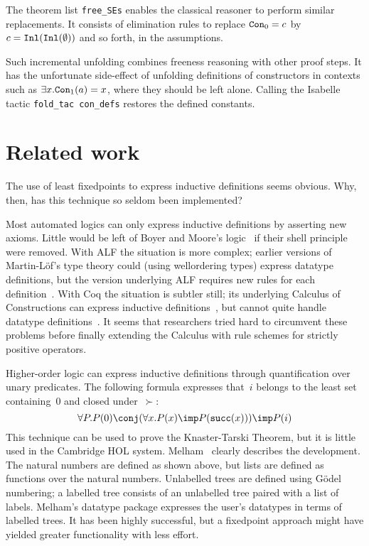 The theorem list \verb|free_SEs| enables the classical
reasoner to perform similar replacements.  It consists of elimination rules
to replace $\hbox{\tt Con}_0=c$ by $c=\hbox{\tt Inl}(\hbox{\tt Inl}(\emptyset))$ and so forth, in the
assumptions.

Such incremental unfolding combines freeness reasoning with other proof
steps.  It has the unfortunate side-effect of unfolding definitions of
constructors in contexts such as $\exists x.\hbox{\tt Con}_1(a)=x$, where they should
be left alone.  Calling the Isabelle tactic {\tt fold\_tac con\_defs}
restores the defined constants.
\fi  %

\section{Related work}\label{related}
The use of least fixedpoints to express inductive definitions seems
obvious.  Why, then, has this technique so seldom been implemented?

Most automated logics can only express inductive definitions by asserting
new axioms.  Little would be left of Boyer and Moore's logic~\cite{bm79} if
their shell principle were removed.  With ALF the situation is more
complex; earlier versions of Martin-L\"of's type theory could (using
wellordering types) express datatype definitions, but the version
underlying ALF requires new rules for each definition~\cite{dybjer91}.
With Coq the situation is subtler still; its underlying Calculus of
Constructions can express inductive definitions~\cite{huet88}, but cannot
quite handle datatype definitions~\cite{paulin92}.  It seems that
researchers tried hard to circumvent these problems before finally
extending the Calculus with rule schemes for strictly positive operators.

Higher-order logic can express inductive definitions through quantification
over unary predicates.  The following formula expresses that~$i$ belongs to the
least set containing~0 and closed under~$\succ$:
\[ \forall P. P(0)\conj (\forall x.P(x)\imp P(\succ(x))) \imp P(i) \] 
This technique can be used to prove the Knaster-Tarski Theorem, but it is
little used in the Cambridge HOL system.  Melham~\cite{melham89} clearly
describes the development.  The natural numbers are defined as shown above,
but lists are defined as functions over the natural numbers.  Unlabelled
trees are defined using G\"odel numbering; a labelled tree consists of an
unlabelled tree paired with a list of labels.  Melham's datatype package
expresses the user's datatypes in terms of labelled trees.  It has been
highly successful, but a fixedpoint approach might have yielded greater
functionality with less effort.

